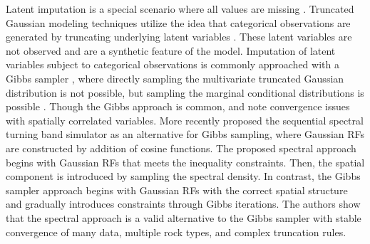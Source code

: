 Latent imputation is a special scenario where all values are missing \citep{little2019statistical}. Truncated Gaussian modeling techniques utilize the idea that categorical observations are generated by truncating underlying latent variables \citep{matheron1987conditional}. These latent variables are not observed and are a synthetic feature of the model. Imputation of latent variables subject to categorical observations is commonly approached with a Gibbs sampler \citep{geman1984stochastic}, where directly sampling the multivariate truncated Gaussian distribution is not possible, but sampling the marginal conditional distributions is possible \citep{silva2018enhanced,arroyo2020iterative,madani2021enhanced}. Though the Gibbs approach is common, \cite{emery2014simulating} and \cite{silva2018enhanced} note convergence issues with spatially correlated variables. More recently \cite{lauzon2020calibration,lauzon2020sequential,lauzon2023joint} proposed the sequential spectral turning band simulator as an alternative for Gibbs sampling, where Gaussian \glspl{RF} are constructed by addition of cosine functions. The proposed spectral approach begins with Gaussian \glspl{RF} that meets the inequality constraints. Then, the spatial component is introduced by sampling the spectral density. In contrast, the Gibbs sampler approach begins with Gaussian \glspl{RF} with the correct spatial structure and gradually introduces constraints through Gibbs iterations. The authors show that the spectral approach is a valid alternative to the Gibbs sampler with stable convergence of many data, multiple rock types, and complex truncation rules.






